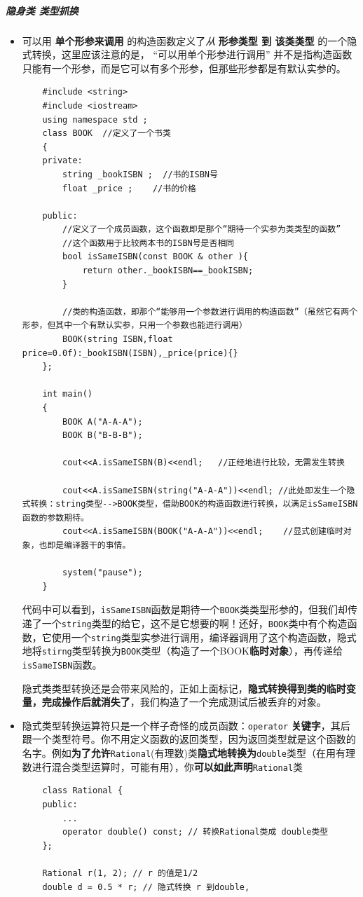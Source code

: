 \documentclass[UTF8,a4paper,12pt]{ctexbook}
\begin{document}
				\subparagraph{隐身类 类型抓换}
					\begin{itemize}
						\item  可以用 \textbf{单个形参来调用} 的构造函数定义了\textit{从} \textbf{形参类型 到 该类类型} 的一个隐式转换，这里应该注意的是， “可以用单个形参进行调用” 并不是指构造函数只能有一个形参，而是它可以有多个形参，但那些形参都是有默认实参的。
						\begin{lstlisting}
	#include <string>
	#include <iostream>
	using namespace std ;
	class BOOK  //定义了一个书类
	{
	private:
		string _bookISBN ;  //书的ISBN号
		float _price ;    //书的价格
	
	public:
		//定义了一个成员函数，这个函数即是那个“期待一个实参为类类型的函数”
		//这个函数用于比较两本书的ISBN号是否相同
		bool isSameISBN(const BOOK & other ){
			return other._bookISBN==_bookISBN;
		}
	
		//类的构造函数，即那个“能够用一个参数进行调用的构造函数”（虽然它有两个形参，但其中一个有默认实参，只用一个参数也能进行调用）
		BOOK(string ISBN,float price=0.0f):_bookISBN(ISBN),_price(price){}
	};
	
	int main()
	{
		BOOK A("A-A-A");
		BOOK B("B-B-B");
		
		cout<<A.isSameISBN(B)<<endl;   //正经地进行比较，无需发生转换
		
		cout<<A.isSameISBN(string("A-A-A"))<<endl; //此处即发生一个隐式转换：string类型-->BOOK类型，借助BOOK的构造函数进行转换，以满足isSameISBN函数的参数期待。
		cout<<A.isSameISBN(BOOK("A-A-A"))<<endl;    //显式创建临时对象，也即是编译器干的事情。
		
		system("pause");
	}
						\end{lstlisting}
						
							代码中可以看到，\verb|isSameISBN|函数是期待一个\verb|BOOK|类类型形参的，但我们却传递了一个\verb|string|类型的给它，这不是它想要的啊！还好，\verb|BOOK|类中有个构造函数，它使用一个\verb|string|类型实参进行调用，编译器调用了这个构造函数，隐式地将\verb|stirng|类型转换为\verb|BOOK|类型（构造了一个BOOK\textbf{临时对象}），再传递给\verb|isSameISBN|函数。
							
							隐式类类型转换还是会带来风险的，正如上面标记，\textbf{隐式转换得到类的临时变量，完成操作后就消失了}，我们构造了一个完成测试后被丢弃的对象。
						\item 隐式类型转换运算符只是一个样子奇怪的成员函数：\verb|operator| \textbf{关键字}，其后跟一个类型符号。你不用定义函数的返回类型，因为返回类型就是这个函数的名字。例如\textbf{为了允许}\verb|Rational|(有理数)类\textbf{隐式地转换为}\verb|double|类型（在用有理数进行混合类型运算时，可能有用），你\textbf{可以如此声明}\verb|Rational|类
						
						\begin{lstlisting}
	class Rational {
	public:
		...
		operator double() const; // 转换Rational类成 double类型
	}; 
	
	Rational r(1, 2); // r 的值是1/2
	double d = 0.5 * r; // 隐式转换 r 到double,
						\end{lstlisting}
					\end{itemize}
				
\end{document}
